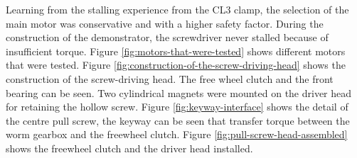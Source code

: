Learning from the stalling experience from the CL3 clamp, the selection of the main motor was conservative and with a higher safety factor. During the construction of the demonstrator, the screwdriver never stalled because of insufficient torque. Figure \ref{fig:motors-that-were-tested} shows different motors that were tested. Figure \ref{fig:construction-of-the-screw-driving-head} shows the construction of the screw-driving head. The free wheel clutch and the front bearing can be seen. Two cylindrical magnets were mounted on the driver head for retaining the hollow screw.
Figure \ref{fig:keyway-interface} shows the detail of the centre pull screw, the keyway can be seen that transfer torque between the worm gearbox and the freewheel clutch. Figure \ref{fig:pull-screw-head-assembled} shows the freewheel clutch and the driver head installed.

